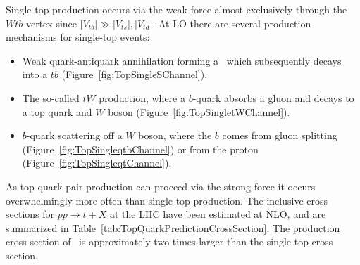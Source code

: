 Single top production occurs via the weak force almost exclusively through the $Wtb$ vertex since $|V_{tb}|\gg|V_{ts}|,|V_{td}|$. At LO there are several production mechanisms for single-top events:

\begin{itemize}
  \item Weak quark-antiquark annihilation forming a \W\ which subsequently decays into a $t\bar{b}$ (Figure~\ref{fig:TopSingleSChannel}).
  \item The so-called $tW$ production, where a $b$-quark absorbs a gluon and decays to a top quark and $W$ boson (Figure~\ref{fig:TopSingletWChannel}).
  \item $b$-quark scattering off a $W$ boson, where the $b$ comes from gluon splitting (Figure~\ref{fig:TopSingleqtbChannel}) or from the proton (Figure~\ref{fig:TopSingleqtChannel}).
\end{itemize}

As top quark pair production can proceed via the strong force it occurs overwhelmingly more often than single top production. The inclusive cross sections for $pp\rightarrow t+X$ at the LHC have been estimated at NLO, and are summarized in Table~\ref{tab:TopQuarkPredictionCrossSection}. The production cross section of \ttbar\ is approximately two times larger than the single-top cross section.


